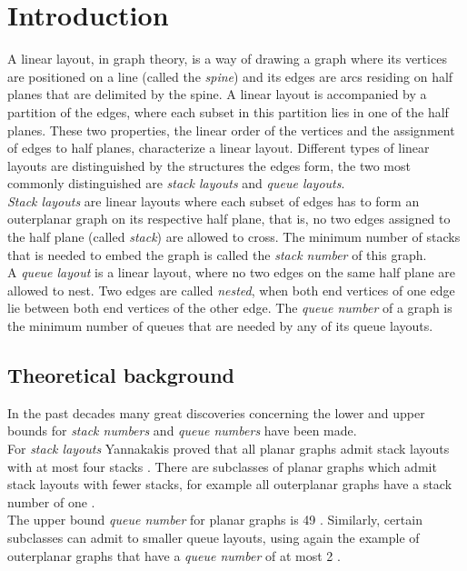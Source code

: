 
\chapter{Introduction}

\label{Introduction}
A linear layout, in graph theory, is a way of drawing a graph where its vertices are positioned on a line (called the \textit{spine}) and its edges are arcs residing on half planes that are delimited by the spine. A linear layout is accompanied by a partition of the edges, where each subset in this partition lies in one of the half planes.
These two properties, the linear order of the vertices and the assignment of edges to half planes, characterize a linear layout. Different types of linear layouts are distinguished by the structures the edges form, the two most commonly distinguished are \textit{stack layouts} and \textit{queue layouts}.\\
\textit{Stack layouts} are linear layouts where each subset of edges has to form an outerplanar graph on its respective half plane, that is, no two edges assigned to the half plane (called \textit{stack}) are allowed to cross. The minimum number of stacks that is needed to embed the graph is called the \textit{stack number} of this graph.\\
A \textit{queue layout} is a linear layout, where no two edges on the same half plane are allowed to nest. Two edges are called \textit{nested}, when both end vertices of one edge lie between both end vertices of the other edge. The \textit{queue number} of a graph is the minimum number of queues that are needed by any of its queue layouts.\\
\section{Theoretical background}
In the past decades many great discoveries concerning the lower and upper bounds for \textit{stack numbers} and \textit{queue numbers} have been made.\\
For \textit{stack layouts} Yannakakis proved that all planar graphs admit stack layouts with at most four stacks \cite{yannakakis1986four,yannakakis1989embedding}. There are subclasses of planar graphs which admit stack layouts with fewer stacks, for example all outerplanar graphs have a stack number of one \cite{bernhart1979book}.\\ 
The upper bound \textit{queue number} for planar graphs is 49 \cite{duj19}. Similarly, certain subclasses can admit to smaller queue layouts, using again the example of outerplanar graphs that have a \textit{queue number} of at most 2 \cite{heath1992comparing}.
